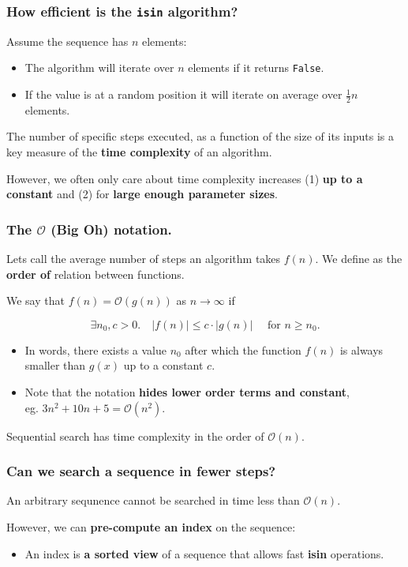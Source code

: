 \documentclass{beamer} %
\newcommand\emc[1]{\textcolor{brightblue}{\textbf{#1}}}
\begin{document}
\begin{frame}
\frametitle{How efficient is the \texttt{isin} algorithm?}

Assume the sequence has $n$ elements:
\begin{itemize}
\item The algorithm will iterate over $n$ elements if it returns \texttt{False}.
\item If the value is at a random position it will iterate on average over $\frac{1}{2} n$ elements.
\end{itemize}

\vspace{5mm}
The number of specific steps executed, as a function of the size of its inputs is a key measure of the \emc{time complexity} of an algorithm.

\vspace{5mm}
However, we often only care about time complexity increases (1) \emc{up to a constant} and (2) for \emc{large enough parameter sizes}.

\end{frame}

\begin{frame}
\frametitle{The $\mathcal{O}$ (Big Oh) notation.}

Lets call the average number of steps an algorithm takes $f(n)$. We define as the \emc{order of} relation between functions.

\vspace{3mm}
We say that $f(n) = \mathcal{O}(g(n))$ as $n \rightarrow \infty$ if

\[ \exists n_0, c > 0. \quad |f(n)| \leq c \cdot |g(n)| \quad \text{ for } n \geq n_0. \]

\begin{itemize}
\item In words, there exists a value $n_0$ after which the function $f(n)$ is always smaller than $g(x)$ up to a constant $c$.
\item Note that the notation \emc{hides lower order terms and constant}, \\ eg. $3n^2 + 10n + 5 = \mathcal{O}(n^2)$.
\end{itemize}

\begin{block}{}
Sequential search has time complexity in the order of $\mathcal{O}(n).$
\end{block}

\end{frame}


\begin{frame}
\frametitle{Can we search a sequence in fewer steps?}

An arbitrary sequnence cannot be searched in time less than $\mathcal{O}(n)$.

\vspace{3mm}
However, we can \emc{pre-compute an index} on the sequence:
\begin{itemize}
	\item An index is \emc{a sorted view} of a sequence that allows fast \emc{isin} operations.
\end{itemize}

\end{frame}
\end{document}
